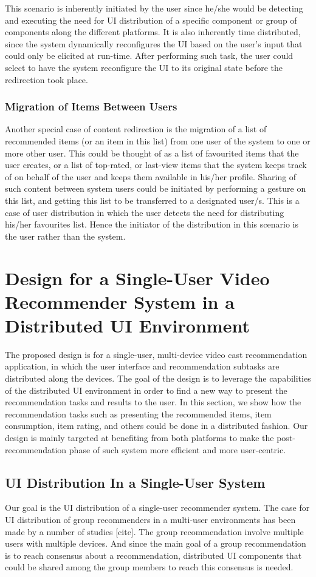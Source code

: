 This scenario is inherently initiated by the user since he/she would be detecting and executing the need for UI distribution of a specific component or group of components along the different platforms. It is also inherently time distributed, since the system dynamically reconfigures the UI based on the user's input that could only be elicited at run-time. After performing such task, the user could select to have the system reconfigure the UI to its original state before the redirection took place.

\subsubsection{Migration of Items Between Users}
Another special case of content redirection is the migration of a list of recommended items (or an item in this list) from one user of the system to one or more other user. This could be thought of as a list of favourited items that the user creates, or a list of top-rated, or last-view items that the system keeps track of on behalf of the user and keeps them available in his/her profile. Sharing of such content between system users could be initiated by performing a gesture on this list, and getting this list to be transferred to a designated user/s. This is a case of user distribution in which the user detects the need for distributing his/her favourites list. Hence the initiator of the distribution in this scenario is the user rather than the system.  
 
\section{Design for a Single-User Video Recommender System in a Distributed UI Environment}
The proposed design is for a single-user, multi-device video cast recommendation application, in which the user interface and recommendation subtasks are distributed along the devices. The goal of the design is to leverage the capabilities of the distributed UI environment in order to find a new way to present the recommendation tasks and results to the user. In this section, we show how the recommendation tasks such as presenting the recommended items, item consumption, item rating, and others could be done in a distributed fashion. Our design is mainly targeted at benefiting from both platforms to make the post-recommendation phase of such system more efficient and more user-centric.

\subsection{UI Distribution In a Single-User System}
Our goal is the UI distribution of a single-user recommender system. The case for UI distribution of group recommenders in a multi-user environments has been made by a number of studies [cite]. The group recommendation involve multiple users with multiple devices. And since the main goal of a group recommendation is to reach consensus about a recommendation, distributed UI components that could be shared among the group members to reach this consensus is needed.

